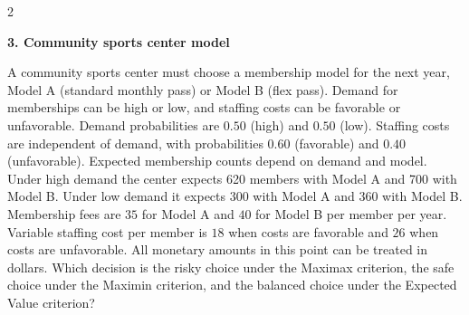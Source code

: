 \documentclass[12pt]{article}
\newcommand{\SubsectionBox}[1]{%
	\noindent\colorbox{gray!30}{%
		\parbox{\linewidth}{\textbf{#1}}%
	}\par\vspace{0.35cm}%
}
\begin{document}
\begin{multicols}{2}
		\vspace{0.25cm}
		\SubsectionBox{3. Community sports center model}\vspace{-0.25cm}
		A community sports center must choose a membership model for the next year, Model A (standard monthly pass)
		or Model B (flex pass). Demand for memberships can be high or low, and staffing costs can be favorable or unfavorable. Demand probabilities are $0.50$ (high) and $0.50$ (low). Staffing costs are independent of demand, with probabilities $0.60$ (favorable) and $0.40$ (unfavorable). Expected membership counts depend on demand and model. Under high demand the center expects 620 members with Model A and 700 with Model B. Under low demand it expects 300 with Model A and 360 with Model B. Membership fees are $35$ for Model A and $40$ for Model B per member per year. Variable staffing cost per member is $18$ when costs are favorable and $26$ when costs are unfavorable. All monetary amounts in this point can be treated in dollars. Which decision is the risky choice under the Maximax criterion, the safe choice under the Maximin criterion, and the balanced choice under the Expected Value criterion?

	\end{multicols}
\end{document}
